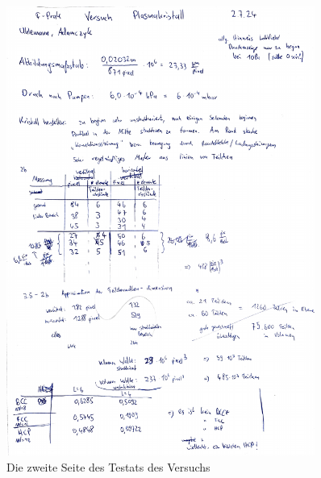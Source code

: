 \documentclass[12pt,a4paper,ngerman]{article}
\begin{document}
 \begin{figure}[ht]
 	\centering
 	\includegraphics[width=0.9\textwidth, page=2]{data/Testat_Plasmakristall.pdf}		
 	\caption[Testat 2]{Die zweite Seite des Testats des Versuchs}
 	\label{fig:Testat}
 \end{figure}
\end{document}
